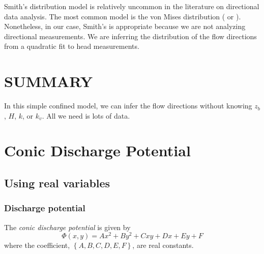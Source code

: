 \documentclass[12pt]{article}
\begin{document}
Smith's distribution model is relatively uncommon in the literature on directional data analysis. The most common model is the von Mises distribution (\citet{Mardia1972} or \citet{Watson1983}). Nonetheless, in our case, Smith's is appropriate because we are not analyzing directional measurements. We are inferring the distribution of the flow directions from a quadratic fit to head measurements.


\section{SUMMARY}
\vspace{0.2in}
\begin{tcolorbox}
{\Large In this simple confined model, we can infer the flow directions without knowing $z_b$, $H$, $k$, or $k_v$. All we need is lots of data.}
\end{tcolorbox}


\newpage




\newpage
\appendix

\section{Conic Discharge Potential}\label{7.1}
\subsection{Using real variables}
\subsubsection{Discharge potential}
The {\em conic discharge potential} is given by
%
\begin{equation} \label{7.2}
\boxed{
    \Phi(x,y) = Ax^2 + By^2 + Cxy + Dx + Ey + F
}
\end{equation}
%
where the coefficient, $\left\{ A, B, C, D, E, F \right\}$, are real constants.
\end{document}
